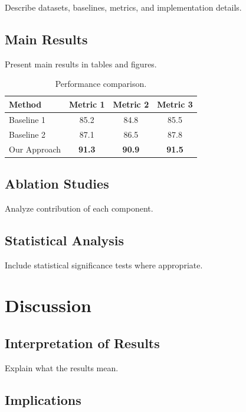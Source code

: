\documentclass[12pt,oneside]{book}
\theoremstyle{plain}
\theoremstyle{definition}
\begin{document}
Describe datasets, baselines, metrics, and implementation details.

\section{Main Results}

Present main results in tables and figures.

\begin{table}[htbp]
\caption{Performance comparison.}
\label{tab:results}
\begin{center}
\begin{tabular}{|l|c|c|c|}
\hline
Method & Metric 1 & Metric 2 & Metric 3 \\
\hline
Baseline 1 & 85.2 & 84.8 & 85.5 \\
Baseline 2 & 87.1 & 86.5 & 87.8 \\
Our Approach & \textbf{91.3} & \textbf{90.9} & \textbf{91.5} \\
\hline
\end{tabular}
\end{center}
\end{table}

\section{Ablation Studies}

Analyze contribution of each component.

\section{Statistical Analysis}

Include statistical significance tests where appropriate.

\chapter{Discussion}
\label{chapter:discussion}

\section{Interpretation of Results}

Explain what the results mean.

\section{Implications}
\end{document}

